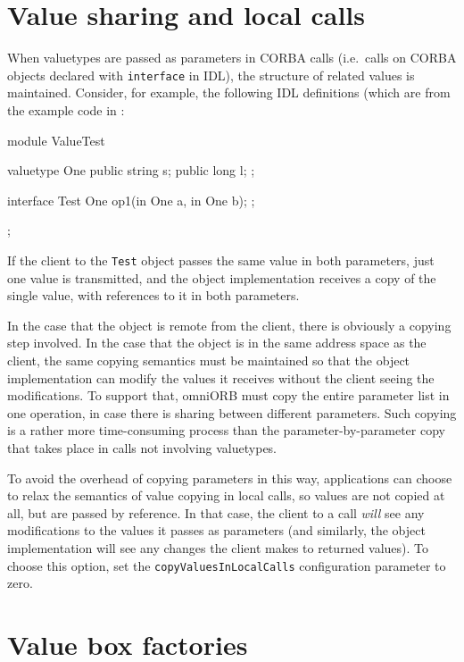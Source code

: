 \documentclass[11pt,twoside,a4paper]{book}
\newcommand{\type}[1]{\texttt{#1}}
\newcommand{\code}[1]{\texttt{#1}}
\newcommand{\file}{\begingroup \urlstyle{tt}\Url}
\begin{document}
\section{Value sharing and local calls}

When valuetypes are passed as parameters in CORBA calls (i.e.\ calls
on CORBA objects declared with \code{interface} in IDL), the structure
of related values is maintained. Consider, for example, the following
IDL definitions (which are from the example code in
\file{src/examples/valuetype/simple}:

\begin{idllisting}
module ValueTest {
  valuetype One {
    public string s;
    public long   l;
  };

  interface Test {
    One op1(in One a, in One b);
  };
};
\end{idllisting}

If the client to the \type{Test} object passes the same value in both
parameters, just one value is transmitted, and the object
implementation receives a copy of the single value, with references to
it in both parameters.

In the case that the object is remote from the client, there is
obviously a copying step involved. In the case that the object is in
the same address space as the client, the same copying semantics must
be maintained so that the object implementation can modify the values
it receives without the client seeing the modifications. To support
that, omniORB must copy the entire parameter list in one operation, in
case there is sharing between different parameters. Such copying is a
rather more time-consuming process than the parameter-by-parameter
copy that takes place in calls not involving valuetypes.

To avoid the overhead of copying parameters in this way, applications
can choose to relax the semantics of value copying in local calls, so
values are not copied at all, but are passed by reference. In that
case, the client to a call \emph{will} see any modifications to the
values it passes as parameters (and similarly, the object
implementation will see any changes the client makes to returned
values). To choose this option, set the \code{copyValuesInLocalCalls}
configuration parameter to zero.


\section{Value box factories}
\end{document}
